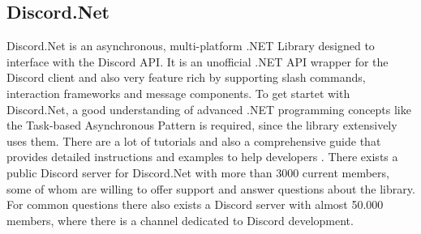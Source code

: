 \subsection{Discord.Net}
\label{ssec:DiscordNet}
Discord.Net is an asynchronous, multi-platform .NET Library designed to interface with the Discord API. It is an unofficial .NET API wrapper for the Discord client and also very feature rich by supporting slash commands, interaction frameworks and message components. To get startet with Discord.Net, a good understanding of advanced .NET programming concepts like the Task-based Asynchronous Pattern is required, since the library extensively uses them. There are a lot of tutorials and also a comprehensive guide that provides detailed instructions and examples to help developers \citep{discorddotnet}. There exists a public Discord server for Discord.Net with more than 3000 current members, some of whom are willing to offer support and answer questions about the library. For common \csharp questions there also exists a Discord server with almost 50.000 members, where there is a channel dedicated to Discord development.

